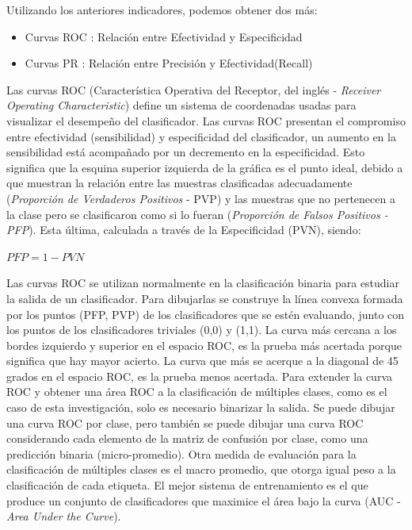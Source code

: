 	Utilizando los anteriores indicadores, podemos obtener dos más:
	\begin{itemize}
		\item Curvas ROC : Relación entre Efectividad y Especificidad
		\item Curvas PR  : Relación entre Precisión y Efectividad(Recall)
	\end{itemize}

	
	Las curvas ROC (Característica Operativa del Receptor, del inglés - \textit{Receiver Operating Characteristic}) define un sistema de coordenadas usadas para visualizar el desempeño del clasificador. Las curvas ROC presentan el compromiso entre efectividad (sensibilidad) y especificidad del clasificador, un aumento en la sensibilidad está acompañado por un decremento en la especificidad. Esto significa que la esquina superior izquierda de la gráfica es el punto ideal, debido a que muestran la relación entre las muestras clasificadas adecuadamente (\textit{Proporción de Verdaderos Positivos} - PVP) y las muestras que no pertenecen a la clase pero se clasificaron como si lo fueran (\textit{Proporción de Falsos Positivos - PFP}). Esta última, calculada a través de la Especificidad (PVN), siendo:
	\begin{center}
	{$PFP= 1 - PVN$}
	\end{center}

	Las curvas ROC se utilizan normalmente en la clasificación binaria para estudiar la salida de un clasificador. Para dibujarlas se construye la línea convexa formada por los puntos (PFP, PVP) de los clasificadores que se estén evaluando, junto con los puntos de los clasificadores triviales (0,0) y (1,1). La curva más cercana a los bordes izquierdo y superior en el espacio ROC, es la prueba más acertada porque significa que hay mayor acierto. La curva que más se acerque a la diagonal de 45 grados en el espacio ROC, es la prueba menos acertada. Para extender la curva ROC y obtener una área ROC a la clasificación de múltiples clases, como es el caso de esta investigación, solo es necesario binarizar la salida. Se puede dibujar una curva ROC por clase, pero también se puede dibujar una curva ROC considerando cada elemento de la matriz de confusión por clase, como una predicción binaria (micro-promedio). Otra medida de evaluación para la clasificación de múltiples clases es el macro promedio, que otorga igual peso a la clasificación de cada etiqueta. El mejor sistema de entrenamiento es el que produce un conjunto de clasificadores que maximice el área bajo la curva (AUC - \textit{Area Under the Curve})\citep{SandovalCereza}.


